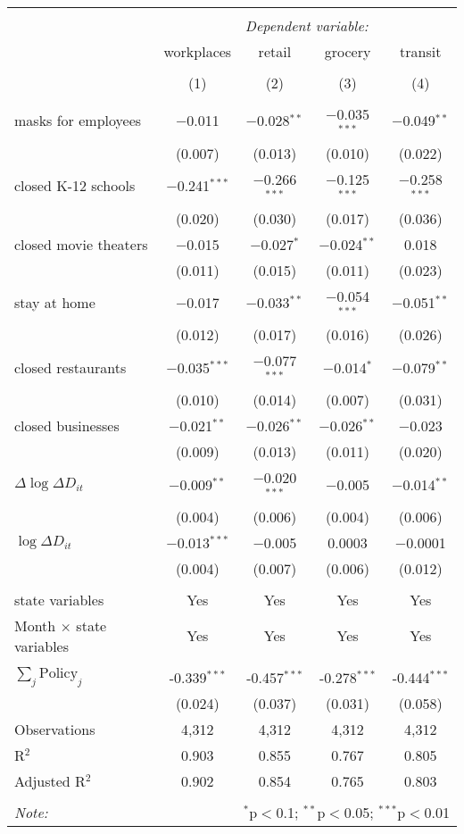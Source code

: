 \begin{tabular}{@{\extracolsep{1pt}}lcccc} 
\\[-1.8ex]\hline 
\hline \\[-1.8ex] 
 & \multicolumn{4}{c}{\textit{Dependent variable:}} \\ 
\cline{2-5} 
 & workplaces & retail & grocery & transit \\ 
\\[-1.8ex] & (1) & (2) & (3) & (4)\\ 
\hline \\[-1.8ex] 
 masks for employees & $-$0.011 & $-$0.028$^{**}$ & $-$0.035$^{***}$ & $-$0.049$^{**}$ \\ 
  & (0.007) & (0.013) & (0.010) & (0.022) \\ 
  closed K-12 schools & $-$0.241$^{***}$ & $-$0.266$^{***}$ & $-$0.125$^{***}$ & $-$0.258$^{***}$ \\ 
  & (0.020) & (0.030) & (0.017) & (0.036) \\ 
  closed movie theaters & $-$0.015 & $-$0.027$^{*}$ & $-$0.024$^{**}$ & 0.018 \\ 
  & (0.011) & (0.015) & (0.011) & (0.023) \\ 
  stay at home & $-$0.017 & $-$0.033$^{**}$ & $-$0.054$^{***}$ & $-$0.051$^{**}$ \\ 
  & (0.012) & (0.017) & (0.016) & (0.026) \\ 
  closed restaurants & $-$0.035$^{***}$ & $-$0.077$^{***}$ & $-$0.014$^{*}$ & $-$0.079$^{**}$ \\ 
  & (0.010) & (0.014) & (0.007) & (0.031) \\ 
  closed businesses & $-$0.021$^{**}$ & $-$0.026$^{**}$ & $-$0.026$^{**}$ & $-$0.023 \\ 
  & (0.009) & (0.013) & (0.011) & (0.020) \\ 
  $\Delta \log \Delta D_{it}$ & $-$0.009$^{**}$ & $-$0.020$^{***}$ & $-$0.005 & $-$0.014$^{**}$ \\ 
  & (0.004) & (0.006) & (0.004) & (0.006) \\ 
  $\log \Delta D_{it}$ & $-$0.013$^{***}$ & $-$0.005 & 0.0003 & $-$0.0001 \\ 
  & (0.004) & (0.007) & (0.006) & (0.012) \\ 
 \hline \\[-1.8ex] 
state variables & Yes & Yes & Yes & Yes \\ 
Month $\times$ state variables & Yes & Yes & Yes & Yes \\ 
\hline \\[-1.8ex] 
$\sum_j \mathrm{Policy}_j$ & -0.339$^{***}$ & -0.457$^{***}$ & -0.278$^{***}$ & -0.444$^{***}$ \\ 
 & (0.024) & (0.037) & (0.031) & (0.058) \\ 
Observations & 4,312 & 4,312 & 4,312 & 4,312 \\ 
R$^{2}$ & 0.903 & 0.855 & 0.767 & 0.805 \\ 
Adjusted R$^{2}$ & 0.902 & 0.854 & 0.765 & 0.803 \\ 
\hline 
\hline \\[-1.8ex] 
\textit{Note:}  & \multicolumn{4}{r}{$^{*}$p$<$0.1; $^{**}$p$<$0.05; $^{***}$p$<$0.01} \\ 
\end{tabular} 